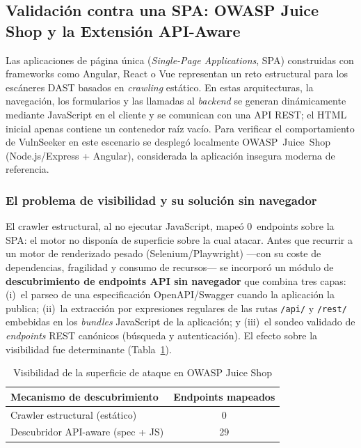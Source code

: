 \documentclass[12pt, a4paper]{article}
\begin{document}
\subsection{Validación contra una SPA: OWASP Juice Shop y la Extensión API-Aware}

Las aplicaciones de página única (\textit{Single-Page Applications}, SPA)
construidas con frameworks como Angular, React o Vue representan un reto
estructural para los escáneres DAST basados en \textit{crawling} estático. En
estas arquitecturas, la navegación, los formularios y las llamadas al
\textit{backend} se generan dinámicamente mediante JavaScript en el cliente y se
comunican con una API REST; el HTML inicial apenas contiene un contenedor raíz
vacío. Para verificar el comportamiento de VulnSeeker en este escenario se
desplegó localmente OWASP~Juice~Shop (Node.js/Express + Angular), considerada la
aplicación insegura moderna de referencia.

\subsubsection{El problema de visibilidad y su solución sin navegador}

El crawler estructural, al no ejecutar JavaScript, mapeó 0~endpoints sobre la
SPA: el motor no disponía de superficie sobre la cual atacar. Antes que recurrir
a un motor de renderizado pesado (Selenium/Playwright) ---con su coste de
dependencias, fragilidad y consumo de recursos--- se incorporó un módulo de
\textbf{descubrimiento de endpoints API sin navegador} que combina tres capas:
(i)~el parseo de una especificación OpenAPI/Swagger cuando la aplicación la
publica; (ii)~la extracción por expresiones regulares de las rutas \texttt{/api/}
y \texttt{/rest/} embebidas en los \textit{bundles} JavaScript de la aplicación;
y (iii)~el sondeo validado de \textit{endpoints} REST canónicos (búsqueda y
autenticación). El efecto sobre la visibilidad fue determinante
(Tabla~\ref{tab:spa-visibilidad}).

\begin{table}[H]
    \centering
    \caption{Visibilidad de la superficie de ataque en OWASP Juice Shop}
    \label{tab:spa-visibilidad}
    \begin{tabular}{l c}
        \toprule
        \textbf{Mecanismo de descubrimiento} & \textbf{Endpoints mapeados} \\
        \midrule
        Crawler estructural (estático)      & 0 \\
        Descubridor API-aware (spec + JS)   & 29 \\
        \bottomrule
    \end{tabular}
\end{table}
\end{document}
